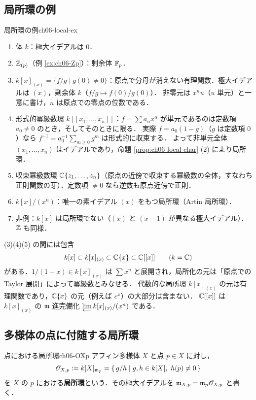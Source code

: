 \subsection{局所環の例}

\begin{myex}{局所環の例}{ch06-local-ex}
\begin{enumerate}
  \item 体 $k$：極大イデアルは $0$．
  \item $\mathbb{Z}_{(p)}$（例 \ref{ex:ch06-Zp}）：剰余体 $\mathbb{F}_p$．
  \item $k[x]_{(x)}=\{f/g\mid g(0)\neq0\}$：原点で分母が消えない有理関数．極大イデアルは $(x)$，剰余体 $k$（$f/g\mapsto f(0)/g(0)$）．
        非零元は $x^n u$（$u$ 単元）と一意に書け，$n$ は原点での零点の位数である．
  \item 形式的冪級数環 $k[[x_1,\dots,x_n]]$：$f=\sum a_\alpha x^\alpha$ が単元であるのは定数項 $a_0\neq0$ のとき，そしてそのときに限る．
        実際 $f=a_0(1-g)$（$g$ は定数項 $0$）なら $f^{-1}=a_0^{-1}\sum_{m\ge0}g^m$ は形式的に収束する．
        よって非単元全体 $(x_1,\dots,x_n)$ はイデアルであり，命題 \ref{prop:ch06-local-char} (2) により局所環．
  \item 収束冪級数環 $\mathbb{C}\{z_1,\dots,z_n\}$（原点の近傍で収束する冪級数の全体，すなわち正則関数の芽）．定数項 $\ne0$ なら逆数も原点近傍で正則．
  \item $k[x]/(x^n)$：唯一の素イデアル $(x)$ をもつ局所環（Artin 局所環）．
  \item 非例：$k[x]$ は局所環でない（$(x)$ と $(x-1)$ が異なる極大イデアル）．$\mathbb{Z}$ も同様．
\end{enumerate}
\end{myex}

(3)(4)(5) の間には包含
\[
  k[x]\subset k[x]_{(x)}\subset \mathbb{C}\{x\}\subset\mathbb{C}[[x]]\qquad(k=\mathbb{C})
\]
がある．$1/(1-x)\in k[x]_{(x)}$ は $\sum x^n$ と展開され，局所化の元は「原点での Taylor 展開」によって冪級数とみなせる．
代数的な局所環 $k[x]_{(x)}$ の元は有理関数であり，$\mathbb{C}\{x\}$ の元（例えば $e^x$）の大部分は含まない．
$\mathbb{C}[[x]]$ は $k[x]_{(x)}$ の $\mathfrak{m}$ 進完備化 $\varprojlim k[x]_{(x)}/(x^n)$ である．

\subsection{多様体の点に付随する局所環}
\label{subsec:ch06-OXp}

\begin{mydef}{点における局所環}{ch06-OXp}
アフィン多様体 $X$ と点 $p\in X$ に対し，
\[
  \mathscr{O}_{X,p}:=k[X]_{\mathfrak{m}_p}=\{\,g/h\mid g,h\in k[X],\ h(p)\neq0\,\}
\]
を $X$ の $p$ における\textbf{局所環}という．その極大イデアルを $\mathfrak{m}_{X,p}=\mathfrak{m}_p\mathscr{O}_{X,p}$ と書く．
\end{mydef}

